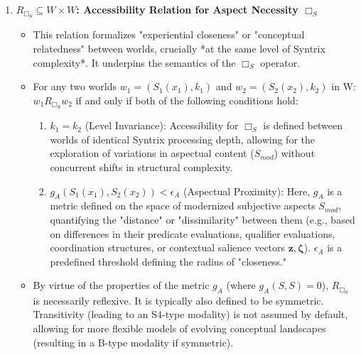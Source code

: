 \documentclass[
    12pt,              %
    a4paper,           %
    headings=normal,   %
    twoside=true,      %
    BCOR=8mm,          %
]{scrbook}
\newcommand{\BoxS}{\Box_S}
\begin{document}
\begin{enumerate}[label=\arabic*.]
    \item  \textbf{\(R_{\BoxS} \subseteq W \times W\): Accessibility Relation for Aspect Necessity \(\BoxS\)}
        \begin{itemize}
            \item   This relation formalizes "experiential closeness" or "conceptual relatedness" between worlds, crucially *at the same level of Syntrix complexity*. It underpins the semantics of the \(\BoxS\) operator.
            \item   For any two worlds \(w_1 = (S_1(x_1), k_1)\) and \(w_2 = (S_2(x_2), k_2)\) in W: \(w_1 R_{\BoxS} w_2\) if and only if both of the following conditions hold:
                \begin{enumerate}[label=(\alph*)]
                    \item  \(k_1 = k_2\) (Level Invariance): Accessibility for \(\BoxS\) is defined between worlds of identical Syntrix processing depth, allowing for the exploration of variations in aspectual content (\(S_{mod}\)) without concurrent shifts in structural complexity.
                    \item  \(g_A(S_1(x_1), S_2(x_2)) < \epsilon_A\) (Aspectual Proximity): Here, \(g_A\) is a metric defined on the space of modernized subjective aspects \(S_{mod}\), quantifying the "distance" or "dissimilarity" between them (e.g., based on differences in their predicate evaluations, qualifier evaluations, coordination structures, or contextual salience vectors \(\mathbf{z}, \mathbf{\zeta}\)). \(\epsilon_A\) is a predefined threshold defining the radius of "closeness."
                \end{enumerate}
            \item   By virtue of the properties of the metric \(g_A\) (where \(g_A(S, S) = 0\)), \(R_{\BoxS}\) is necessarily reflexive. It is typically also defined to be symmetric. Transitivity (leading to an S4-type modality) is not assumed by default, allowing for more flexible models of evolving conceptual landscapes (resulting in a B-type modality if symmetric).
        \end{itemize}


\end{enumerate}
\end{document}
